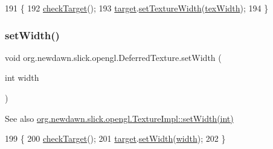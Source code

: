 \begin{DoxyCode}
191                                               \{
192         \mbox{\hyperlink{classorg_1_1newdawn_1_1slick_1_1opengl_1_1_deferred_texture_a22f14bcd9cbd4bf033e2308b90464dce}{checkTarget}}();
193         \mbox{\hyperlink{classorg_1_1newdawn_1_1slick_1_1opengl_1_1_deferred_texture_aa70a4b195d0b965a0099d0e7bc18d9d2}{target}}.\mbox{\hyperlink{classorg_1_1newdawn_1_1slick_1_1opengl_1_1_texture_impl_a5bc77da717bc19ad2bfff9c873919719}{setTextureWidth}}(\mbox{\hyperlink{classorg_1_1newdawn_1_1slick_1_1opengl_1_1_texture_impl_acb22083c60049df21f8e484413d73212}{texWidth}});
194     \}
\end{DoxyCode}
\mbox{\label{classorg_1_1newdawn_1_1slick_1_1opengl_1_1_deferred_texture_a9144d63a13f1e57b06ad77a2b1b34cf0}} 
\subsubsection{\texorpdfstring{set\+Width()}{setWidth()}}
{\footnotesize\ttfamily void org.\+newdawn.\+slick.\+opengl.\+Deferred\+Texture.\+set\+Width (\begin{DoxyParamCaption}\item[{int}]{width }\end{DoxyParamCaption})\hspace{0.3cm}{\ttfamily [inline]}}

\begin{DoxySeeAlso}{See also}
\mbox{\hyperlink{classorg_1_1newdawn_1_1slick_1_1opengl_1_1_texture_impl_a42c503751c7342ebfca3a8c5ab7b8c18}{org.\+newdawn.\+slick.\+opengl.\+Texture\+Impl\+::set\+Width(int)}} 
\end{DoxySeeAlso}

\begin{DoxyCode}
199                                     \{
200         \mbox{\hyperlink{classorg_1_1newdawn_1_1slick_1_1opengl_1_1_deferred_texture_a22f14bcd9cbd4bf033e2308b90464dce}{checkTarget}}();
201         \mbox{\hyperlink{classorg_1_1newdawn_1_1slick_1_1opengl_1_1_deferred_texture_aa70a4b195d0b965a0099d0e7bc18d9d2}{target}}.\mbox{\hyperlink{classorg_1_1newdawn_1_1slick_1_1opengl_1_1_texture_impl_a42c503751c7342ebfca3a8c5ab7b8c18}{setWidth}}(\mbox{\hyperlink{classorg_1_1newdawn_1_1slick_1_1opengl_1_1_texture_impl_a73412d6372fabe2942ffa281f91a830c}{width}});
202     \}
\end{DoxyCode}


